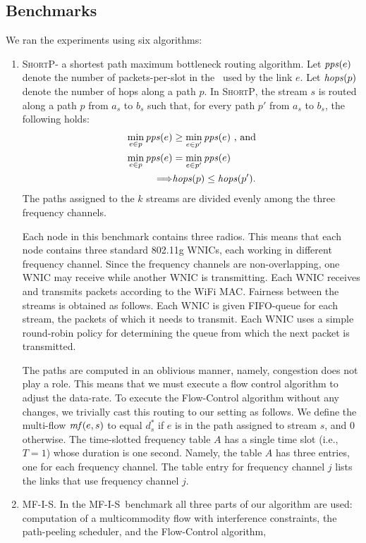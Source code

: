 \documentclass[11pt]{article}
\newenvironment{proof sketch}[1]{\noindent {\emph{Proof sketch of #1:}}}{\hfill \qed}
\newcommand{\pps}{\text{\emph{pps}}}
\newcommand{\hops}{\text{\emph{hops}}}
\newcommand{\mf}{\text{\emph{mf}}}
\newcommand{\MCS}{\text{\sc{mcs}}}
\newcommand{\algA}{\textsc{MF-I-S}}
\newcommand{\algB}{\textsc{ShortP}}
\newcommand{\algS}{\algB}
\begin{document}
\subsection{Benchmarks}\label{sec:bench}
We ran the experiments using six algorithms:
\begin{enumerate}
\item \algS - a shortest path maximum bottleneck routing algorithm.
  Let $\pps(e)$ denote the number of packets-per-slot in the \MCS\
  used by the link $e$.  Let $\hops(p)$ denote the number of hops
  along a path $p$. In \algS, the stream $s$ is routed along a path
  $p$ from $a_s$ to $b_s$ such that, for every path $p'$ from $a_s$ to
  $b_s$, the following holds:
  \begin{align*}
    \min_{e \in p} \pps(e) &\geq \min_{e \in p'} \pps(e) \text{ , and}\\
    \min_{e \in p} \pps(e) &= \min_{e \in p'} \pps(e)  \\
    \Longrightarrow &\hops(p) \leq \hops(p').
  \end{align*}
  The paths assigned to the $k$ streams are divided evenly among the
  three frequency channels.

  Each node in this benchmark contains three radios. This means that
  each node contains three standard 802.11g WNICs, each working in
  different frequency channel.  Since the frequency channels are
  non-overlapping, one WNIC may receive while another WNIC is
  transmitting.  Each WNIC receives and transmits packets according to
  the WiFi MAC.  Fairness between the streams is obtained as follows.
  Each WNIC is given FIFO-queue for each stream, the packets of which
  it needs to transmit. Each WNIC uses a simple round-robin policy for
  determining the queue from which the next packet is transmitted.

  The paths are computed in an oblivious manner, namely, congestion
  does not play a role. This means that we must execute a flow control
  algorithm to adjust the data-rate.  To execute the Flow-Control
  algorithm without any changes, we trivially cast this routing to our
  setting as follows.  We define the multi-flow $\mf(e,s)$ to equal
  $d^*_s$ if $e$ is in the path assigned to stream $s$, and $0$
  otherwise. The time-slotted frequency table $A$ has a single time
  slot (i.e., $T=1$) whose duration is one second. Namely, the table
  $A$ has three entries, one for each frequency channel.  The table
  entry for frequency channel $j$ lists the links that use frequency
  channel $j$.
\item \algA. In the \algA\ benchmark all three parts of our algorithm
  are used: computation of a multicommodity flow with interference
  constraints, the path-peeling scheduler, and the Flow-Control
  algorithm,


\end{enumerate}
\end{document}
